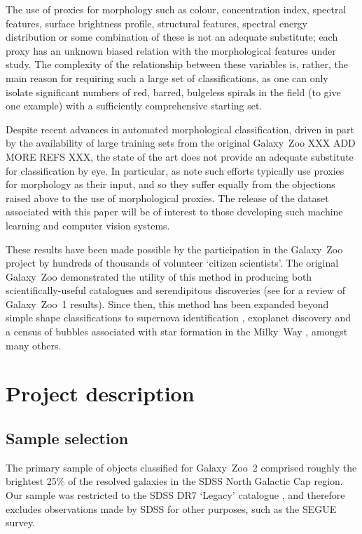 \documentclass[useAMS,usenatbib]{mn2e}
\begin{document}
The use of proxies for morphology such as colour, concentration index, spectral features, surface brightness profile, structural features, spectral energy distribution or some combination of these is not an adequate substitute; each proxy has an unknown biased relation with the morphological features under study. The complexity of the relationship between these variables is, rather, the main reason for requiring such a large set of classifications, as one can only isolate significant numbers of red, barred, bulgeless spirals in the field (to give one example) with a sufficiently comprehensive starting set. 

Despite recent advances in automated morphological classification, driven in part by the availability of large training sets from the original Galaxy~Zoo \citep{ban10,hue11,dav13} XXX ADD MORE REFS XXX, the state of the art does not provide an adequate substitute for classification by eye. In particular, as \citet{lin11} note such efforts typically use proxies for morphology as their input, and so they suffer equally from the objections raised above to the use of morphological proxies. The release of the dataset associated with this paper will be of interest to those developing such machine learning and computer vision systems. 

These results have been made possible by the participation in the Galaxy~Zoo project by hundreds of thousands of volunteer `citizen scientists'. The original Galaxy~Zoo demonstrated the utility of this method in producing both scientifically-useful catalogues and serendipitous discoveries (see \citet{lin11} for a review of Galaxy~Zoo~1 results). Since then, this method has been expanded beyond simple shape classifications to supernova identification \citep{smi11}, exoplanet discovery \citep{fis12,sch12} and a census of bubbles associated with star formation in the Milky~Way \citep{sim12a}, amongst many others. 


\section{Project description} \label{sec-description}

\subsection{Sample selection} \label{ssec-sample}
The primary sample of objects classified for Galaxy~Zoo~2 comprised roughly the brightest 25\% of the resolved galaxies in the SDSS North Galactic Cap region. Our sample was restricted to the SDSS DR7 `Legacy' catalogue \citep{aba09}, and therefore excludes observations made by SDSS for other purposes, such as the SEGUE survey. 
\end{document}
